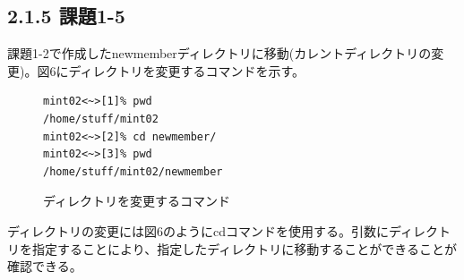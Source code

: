 \documentclass[12pt]{jreport}
\begin{document}
            \subsection*{2.1.5 課題1-5}
                課題1-2で作成したnewmemberディレクトリに移動(カレントディレクトリの変更)。図6にディレクトリを変更するコマンドを示す。
                \begin{figure}[H]
                    \begin{center}
                        \begin{screen}
                            \begin{verbatim}
mint02<~>[1]% pwd
/home/stuff/mint02
mint02<~>[2]% cd newmember/
mint02<~>[3]% pwd
/home/stuff/mint02/newmember
                            \end{verbatim}
                        \end{screen}
                        \caption{ディレクトリを変更するコマンド}
                        \label{6}
                    \end{center}
                \end{figure}
                ディレクトリの変更には図6のようにcdコマンドを使用する。引数にディレクトリを指定することにより、指定したディレクトリに移動することができることが確認できる。
\end{document}

